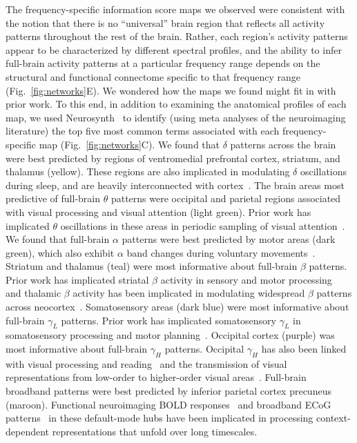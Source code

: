 \documentclass[11pt]{article}
\begin{document}
The frequency-specific information score maps we observed were consistent with
the notion that there is no ``universal'' brain region that  reflects all
activity patterns throughout the rest of the brain.  Rather, each region's
activity patterns appear to be characterized by different spectral profiles, and
the ability to infer full-brain activity patterns at a particular frequency
range depends on the structural and functional connectome specific to that
frequency range (Fig.~\ref{fig:networks}E).  We wondered how the maps we found
might fit in with prior work.  To this end, in addition to examining the
anatomical profiles of each map, we used Neurosynth~\citep{RubiEtal17} to
identify (using meta analyses of the neuroimaging literature) the top five most
common terms associated with each frequency-specific map
(Fig.~\ref{fig:networks}C).  We found that $\delta$ patterns across the brain
were best predicted by regions of ventromedial prefrontal cortex, striatum, and
thalamus (yellow).  These regions are also implicated in modulating $\delta$
oscillations during sleep, and are heavily interconnected with
cortex~\citep[e.g.,][]{AmziSter98}.  The brain areas most predictive of
full-brain $\theta$ patterns were occipital and parietal regions associated with
visual processing and visual attention (light green). Prior work has implicated
$\theta$ oscillations in these areas in periodic sampling of visual
attention~\citep[e.g.,][]{BuscVanR10}.  We found that full-brain $\alpha$
patterns were best predicted by motor areas (dark green), which also exhibit
$\alpha$ band changes during voluntary movements~\citep[e.g.,][]{JurkEtal06}.
Striatum and thalamus (teal) were most informative about full-brain $\beta$
patterns.  Prior work has implicated striatal $\beta$ activity in sensory and
motor processing~\citep{FeinEtal15} and thalamic $\beta$ activity has been
implicated in modulating widespread $\beta$ patterns across
neocortex~\citep{SherEtal16}. Somatosensory areas (dark blue) were most
informative about full-brain $\gamma_L$ patterns. Prior work has implicated
somatosensory $\gamma_L$ in somatosensory processing and motor
planning~\citep{IharEtal03}.  Occipital cortex (purple) was most informative
about full-brain $\gamma_H$ patterns.  Occipital $\gamma_H$ has also been linked
with visual processing and reading~\citep{WuEtal11} and the transmission of
visual representations from low-order to higher-order visual
areas~\citep{MatsEtal13}.  Full-brain broadband patterns were best predicted by
inferior parietal cortex precuneus (maroon).  Functional neuroimaging BOLD
responses~\citep{SimoEtal16} and broadband ECoG patterns~\citep{HoneEtal12a} in
these default-mode hubs have been implicated in processing context-dependent
representations that unfold over long timescales.
\end{document}
